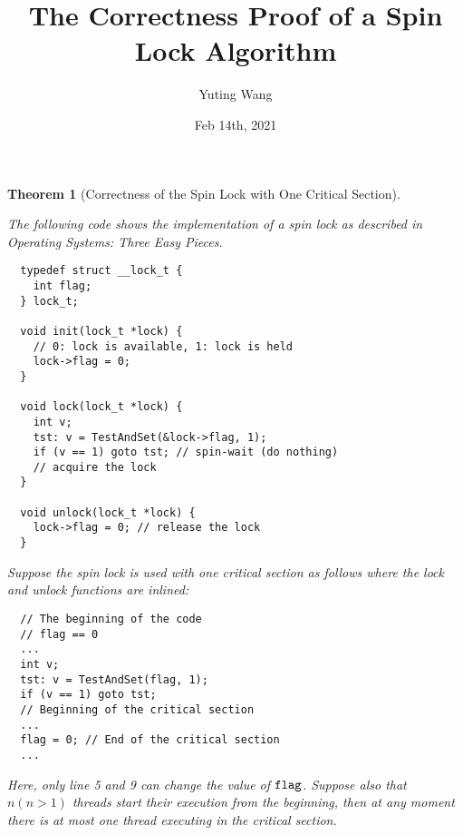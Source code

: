 \documentclass{article}[10pt]
\title{The Correctness Proof of a Spin Lock Algorithm}
\author{Yuting Wang}
\date{Feb 14th, 2021}
\newtheorem{mythm}[mydef]{Theorem}
\newcommand{\kwd}[1]{\ensuremath{\text{\ttfamily #1}}\xspace}
\def\kflag{\kwd{flag}}
\begin{document}
\maketitle


\begin{mythm}[Correctness of the Spin Lock with One Critical Section]
\label{ref:spin-lock-correctness}

The following code shows the implementation of a spin lock as
described in Operating Systems: Three Easy Pieces.
%
\begin{lstlisting}
  typedef struct __lock_t {
    int flag;
  } lock_t;

  void init(lock_t *lock) {
    // 0: lock is available, 1: lock is held
    lock->flag = 0;
  }

  void lock(lock_t *lock) {
    int v;
    tst: v = TestAndSet(&lock->flag, 1);
    if (v == 1) goto tst; // spin-wait (do nothing)
    // acquire the lock
  }

  void unlock(lock_t *lock) {
    lock->flag = 0; // release the lock
  }  
\end{lstlisting}
%
Suppose the spin lock is used with one critical section as follows
where the lock and unlock functions are inlined:
%
\begin{lstlisting}
  // The beginning of the code
  // flag == 0
  ...
  int v;
  tst: v = TestAndSet(flag, 1);
  if (v == 1) goto tst;
  // Beginning of the critical section
  ...
  flag = 0; // End of the critical section
  ...
\end{lstlisting}
%
Here, only line 5 and 9 can change the value of \kflag.
%
Suppose also that $n (n > 1)$ threads start their execution from the
beginning, then at any moment there is at most one thread executing in
the critical section.
\end{mythm}
%
\end{document}
